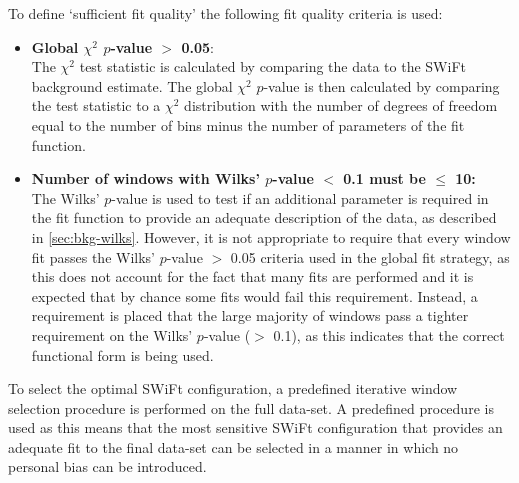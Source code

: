 \noindent
To define `sufficient fit quality' the following fit quality criteria is used:
\begin{itemize}[leftmargin=*]  
\item \textbf{Global $\chi^{2}$ \mbox{$p$-value} $>$ 0.05}:\\
  The $\chi^{2}$ test statistic is calculated by comparing the data to the SWiFt background estimate.
  The global $\chi^{2}$ \mbox{$p$-value} is then calculated by comparing the test statistic
  to a $\chi^{2}$ distribution with the number of degrees of freedom equal to the number of bins
  minus the number of parameters of the fit function.\vspace{0.5em}
\item \textbf{Number of windows with Wilks' \mbox{$p$-value} $<$ 0.1 must be $\leq$ 10:}\\
  The Wilks' \mbox{$p$-value} is used to test if an additional parameter is required in the fit function
  to provide an adequate description of the data, as described in \ref{sec:bkg-wilks}. 
  However, it is not appropriate to require that every window fit passes the Wilks' $p$-value $>$ 0.05 criteria used in the global fit strategy,
  as this does not account for the fact that many fits are performed and it is expected that by chance some fits would fail this requirement.
  Instead, a requirement is placed that the large majority of windows pass a tighter requirement on the Wilks' $p$-value ($>$ 0.1),
  as this indicates that the correct functional form is being used.
\end{itemize}

To select the optimal SWiFt configuration, a predefined iterative window selection procedure is performed on the full \lm{} data-set.
A predefined procedure is used as this means that the most sensitive SWiFt configuration that provides an adequate fit to the final data-set can be selected
in a manner in which no personal bias can be introduced.



